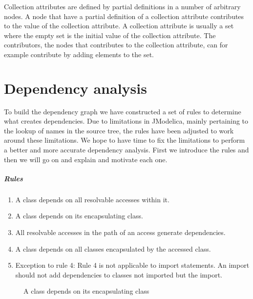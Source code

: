 \documentclass{cslthse-msc}
\begin{document}
Collection attributes are defined by partial definitions in a number of arbitrary nodes. A node that have a partial definition of a collection attribute contributes to the value of the collection attribute. A collection attribute is usually a set where the empty set is the initial value of the collection attribute. The contributors, the nodes that contributes to the collection attribute, can for example contribute by adding elements to the set.~\cite{magnusson2007extending}

\chapter[Dependency analysis]{Dependency analysis}

To build the dependency graph we have constructed a set of rules to determine what creates dependencies. Due to limitations in JModelica, mainly pertaining to the lookup of names in the source tree, the rules have been adjusted to work around these limitations. We hope to have time to fix the limitations to perform a better and more accurate dependency analysis. First we introduce the rules and then we will go on and explain and motivate each one.

\paragraph{Rules}
\begin{enumerate}
\item A class depends on all resolvable accesses within it.
\item A class depends on its encapsulating class. 
\item All resolvable accesses in the path of an access generate dependencies.
\item A class depends on all classes encapsulated by the accessed class.
\item Exception to rule 4: Rule 4 is not applicable to import statements. An import should not add dependencies to classes not imported but the import.
\end{enumerate}


\begin{figure}[!htbp]
    \centering
    \qquad
    \subfloat{\raisebox{3.2 cm}{}}
    \caption{A class depends on its encapsulating class}
    \label{fig:parentGraph}
\end{figure}
\end{document}
